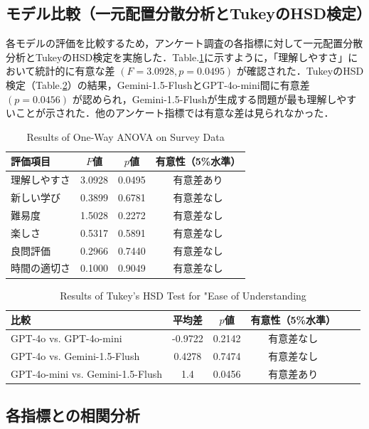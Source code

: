 \documentclass[twocolumn, fleqn, uplatex]{jsarticle}
\begin{document}
\subsection{モデル比較（一元配置分散分析とTukeyのHSD検定）}

各モデルの評価を比較するため，アンケート調査の各指標に対して一元配置分散分析とTukeyのHSD検定を実施した．Table.\ref{tab:anova_results}に示すように，「理解しやすさ」において統計的に有意な差 $(F=3.0928, p=0.0495)$ が確認された．TukeyのHSD検定（Table.\ref{tab:tukey_hsd_understanding}）の結果，Gemini-1.5-FlushとGPT-4o-mini間に有意差 $(p=0.0456)$ が認められ，Gemini-1.5-Flushが生成する問題が最も理解しやすいことが示された．他のアンケート指標では有意な差は見られなかった．

\begin{table}[t]
\centering
\footnotesize
\caption{Results of One-Way ANOVA on Survey Data}
\label{tab:anova_results}
\begin{tabular}{lccc}
\hline
評価項目 & $F$値 & $p$値 & 有意性（5\%水準） \\
\hline
理解しやすさ & 3.0928 & 0.0495 & 有意差あり \\
新しい学び & 0.3899 & 0.6781 & 有意差なし \\
難易度 & 1.5028 & 0.2272 & 有意差なし \\
楽しさ & 0.5317 & 0.5891 & 有意差なし \\
良問評価 & 0.2966 & 0.7440 & 有意差なし \\
時間の適切さ & 0.1000 & 0.9049 & 有意差なし \\
\hline
\end{tabular}
\end{table}

\begin{table}[t]
\centering
\scriptsize
\caption{Results of Tukey's HSD Test for "Ease of Understanding}
\label{tab:tukey_hsd_understanding}
\begin{tabular}{lccccc}
\hline
比較 & 平均差 & $p$値  & 有意性（5\%水準） \\
\hline
GPT-4o vs. GPT-4o-mini & -0.9722 & 0.2142  & 有意差なし \\
GPT-4o vs. Gemini-1.5-Flush & 0.4278 & 0.7474  & 有意差なし \\
GPT-4o-mini vs. Gemini-1.5-Flush & 1.4 & 0.0456 & 有意差あり \\
\hline
\end{tabular}
\end{table}

\subsection{各指標との相関分析}
\end{document}
